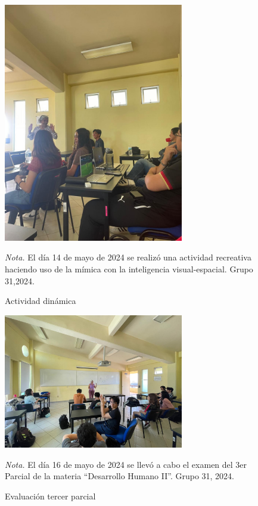 \begin{figure}
    \caption{Actividad din\'amica\label{fig:No.5}}
    \includegraphics[width=0.7\textwidth]{./assets/img/imagen5DH.jpeg}

	\textit{Nota.} El d\'ia 14 de mayo de 2024 se realiz\'o una actividad recreativa haciendo uso de la m\'imica con la inteligencia visual-espacial. Grupo 31,2024.
\end{figure}

\begin{figure}
    \caption{Evaluaci\'on tercer parcial\label{fig:No.6}}
    \includegraphics[width=0.7\textwidth]{./assets/img/imagen6DH.jpeg}

	\textit{Nota.} El d\'ia 16 de mayo de 2024 se llev\'o a cabo el examen del 3er Parcial de la materia ``Desarrollo Humano II''. Grupo 31, 2024.
\end{figure}
